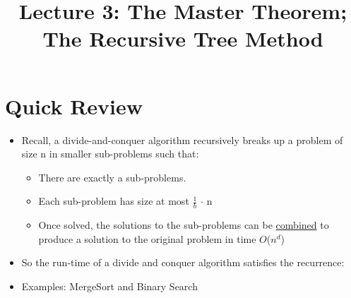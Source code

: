 \documentclass[12pt]{article}
\title{\huge Lecture 3: The Master Theorem; The Recursive Tree Method}
\author{}
\date{}
\begin{document}
\maketitle
\section{Quick Review}
\renewcommand{\labelitemii}{$\circ$}
\renewcommand{\labelitemiii}{$\cdot$}
\renewcommand{\labelitemiii}{$\rightarrow$}
\begin{itemize}
\item Recall, a divide-and-conquer algorithm recursively breaks up a problem of size n in smaller sub-problems such that:
	\begin{itemize}
	\item There are exactly a sub-problems.
	\item Each sub-problem has size at most {\large $\frac{1}{b}$ $\cdot$ n}
	\item Once solved, the solutions to the sub-problems can be \underline{combined} to produce 	a solution to the original problem in time $O$($n^d$)
	\end{itemize}
\item So the run-time of a divide and conquer algorithm satisfies the recurrence:

 \hspace*{\fill} 

\item Examples: MergeSort and Binary Search
\end{itemize}
\end{document}

